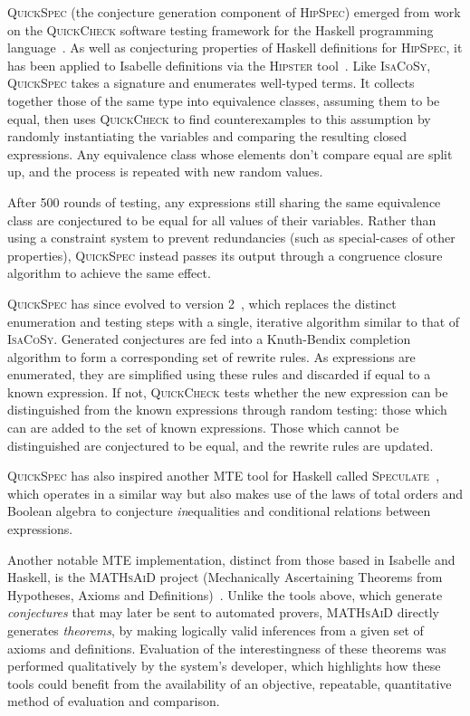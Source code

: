 \textsc{QuickSpec} (the conjecture generation component of \textsc{HipSpec})
emerged from work on the \textsc{QuickCheck} software testing framework for the
Haskell programming language~\cite{claessen2011quickcheck}. As well as
conjecturing properties of Haskell definitions for \textsc{HipSpec}, it has been
applied to Isabelle definitions via the \textsc{Hipster} tool~\cite{Hipster}.
Like \textsc{IsaCoSy}, \textsc{QuickSpec} takes a signature and enumerates
well-typed terms. It collects together those of the same type into equivalence
classes, assuming them to be equal, then uses \textsc{QuickCheck} to find
counterexamples to this assumption by randomly instantiating the variables and
comparing the resulting closed expressions. Any equivalence class whose elements
don't compare equal are split up, and the process is repeated with new random
values.

After 500 rounds of testing, any expressions still sharing the same equivalence
class are conjectured to be equal for all values of their variables. Rather than
using a constraint system to prevent redundancies (such as special-cases of
other properties), \textsc{QuickSpec} instead passes its output through a
congruence closure algorithm to achieve the same effect.

\textsc{QuickSpec} has since evolved to version 2~\cite{smallbone2017quick},
which replaces the distinct enumeration and testing steps with a single,
iterative algorithm similar to that of \textsc{IsaCoSy}. Generated conjectures
are fed into a Knuth-Bendix completion algorithm to form a corresponding set of
rewrite rules. As expressions are enumerated, they are simplified using these
rules and discarded if equal to a known expression. If not, \textsc{QuickCheck}
tests whether the new expression can be distinguished from the known expressions
through random testing: those which can are added to the set of known
expressions. Those which cannot be distinguished are conjectured to be equal,
and the rewrite rules are updated.

\textsc{QuickSpec} has also inspired another MTE tool for Haskell called
\textsc{Speculate}~\cite{braquehais2017speculate}, which operates in a similar
way but also makes use of the laws of total orders and Boolean algebra to
conjecture \emph{in}equalities and conditional relations between expressions.

Another notable MTE implementation, distinct from those based in Isabelle and
Haskell, is the \textsc{MATHsAiD} project (Mechanically Ascertaining Theorems
from Hypotheses, Axioms and Definitions)~\cite{roy}. Unlike the tools above,
which generate \emph{conjectures} that may later be sent to automated provers,
\textsc{MATHsAiD} directly generates \emph{theorems}, by making logically valid
inferences from a given set of axioms and definitions. Evaluation of the
interestingness of these theorems was performed qualitatively by the system's
developer, which highlights how these tools could benefit from the availability
of an objective, repeatable, quantitative method of evaluation and comparison.
